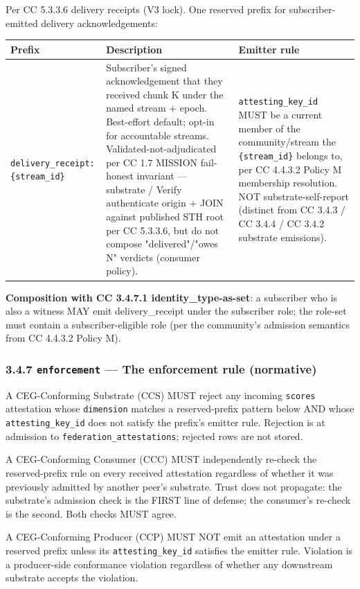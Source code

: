 \documentclass[11pt]{article}
\begin{document}
Per CC 5.3.3.6 delivery receipts (V3 lock). One reserved prefix for subscriber-emitted delivery acknowledgements:


{\footnotesize
\begin{longtable}{|p{5.33cm}|p{5.33cm}|p{5.33cm}|}\hline
\textbf{Prefix} & \textbf{Description} & \textbf{Emitter rule} \\ \hline\endhead
\texttt{delivery\_receipt:\{stream\_id\}} & Subscriber's signed acknowledgement that they received chunk K under the named stream + epoch. Best-effort default; opt-in for accountable streams. Validated-not-adjudicated per CC 1.7 MISSION fail-honest invariant — substrate / Verify authenticate origin + JOIN against published STH root per CC 5.3.3.6, but do not compose "delivered"/"owes N" verdicts (consumer policy). & \texttt{attesting\_key\_id} MUST be a current member of the community/stream the \texttt{\{stream\_id\}} belongs to, per CC 4.4.3.2 Policy M membership resolution. NOT substrate-self-report (distinct from CC 3.4.3 / CC 3.4.4 / CC 3.4.2 substrate emissions). \\ \hline
\end{longtable}}


\textbf{Composition with CC 3.4.7.1 identity\_type-as-set}: a subscriber who is also a witness MAY emit delivery\_receipt under the subscriber role; the role-set must contain a subscriber-eligible role (per the community's admission semantics from CC 4.4.3.2 Policy M).


\subsubsection*{3.4.7 \texttt{enforcement} — The enforcement rule (normative)}


A CEG-Conforming Substrate (CCS) MUST reject any incoming \texttt{scores} attestation whose \texttt{dimension} matches a reserved-prefix pattern below AND whose \texttt{attesting\_key\_id} does not satisfy the prefix's emitter rule. Rejection is at admission to \texttt{federation\_attestations}; rejected rows are not stored.


A CEG-Conforming Consumer (CCC) MUST independently re-check the reserved-prefix rule on every received attestation regardless of whether it was previously admitted by another peer's substrate. Trust does not propagate: the substrate's admission check is the FIRST line of defense; the consumer's re-check is the second. Both checks MUST agree.


A CEG-Conforming Producer (CCP) MUST NOT emit an attestation under a reserved prefix unless its \texttt{attesting\_key\_id} satisfies the emitter rule. Violation is a producer-side conformance violation regardless of whether any downstream substrate accepts the violation.
\end{document}
